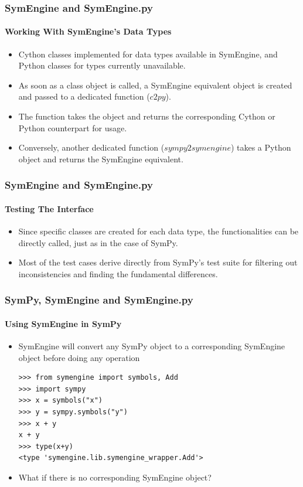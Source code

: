 \documentclass{beamer}
\begin{document}
\begin{frame}
\frametitle{SymEngine and SymEngine.py}
\framesubtitle{Working With SymEngine's Data Types}
\begin{itemize}
    \item Cython classes implemented for data types available in SymEngine, and Python
        classes for types currently unavailable.
    \item As soon as a class object is called, a SymEngine equivalent object is created
        and passed to a dedicated function ($c2py$).
    \item The function takes the object and returns the corresponding Cython
        or Python counterpart for usage.
    \item Conversely, another dedicated function ($sympy2symengine$) takes a Python object
        and returns the SymEngine equivalent.
\end{itemize}
\end{frame}


\begin{frame}
\frametitle{SymEngine and SymEngine.py}
\framesubtitle{Testing The Interface}
\begin{itemize}
    \item Since specific classes are created for each data type, the functionalities
        can be directly called, just as in the case of SymPy.
    \item Most of the test cases derive directly from SymPy's test suite for filtering
        out inconsistencies and finding the fundamental differences.
\end{itemize}
\end{frame}


\begin{frame}[fragile]
\frametitle{SymPy, SymEngine and SymEngine.py}
\framesubtitle{Using SymEngine in SymPy}
\begin{itemize}
\item
SymEngine will convert any SymPy object to a corresponding SymEngine object before doing any operation

\begin{verbatim}
>>> from symengine import symbols, Add
>>> import sympy
>>> x = symbols("x")
>>> y = sympy.symbols("y")
>>> x + y
x + y
>>> type(x+y)
<type 'symengine.lib.symengine_wrapper.Add'>
\end{verbatim}
\item
What if there is no corresponding SymEngine object?
\end{itemize}
\end{frame}
\end{document}

